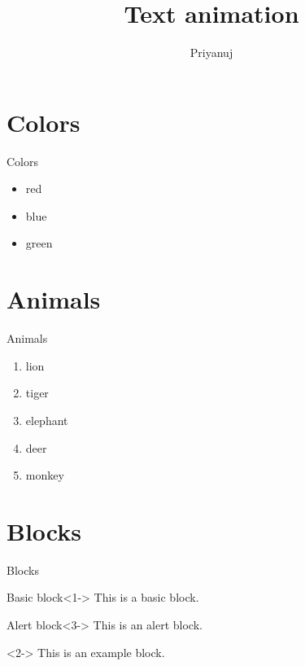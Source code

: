 \documentclass{beamer}
\title{Text animation}
\author{Priyanuj}
\date{}
\begin{document}
	\begin{frame}
		\maketitle
	\end{frame}
	
	\section{Colors}
	\begin{frame}{Colors}
		\begin{itemize}
			\item red \pause
			\item blue \pause
			\item green
		\end{itemize}
	\end{frame}
	
	\section{Animals}
	\begin{frame}{Animals}
		\begin{enumerate}
			\item<1-> lion
			\item<3> tiger
			\item<4-> elephant
			\item<2-> deer
			\item<5-> monkey
		\end{enumerate}
	\end{frame}
	
	\section{Blocks}
	\begin{frame}{Blocks}
		\begin{block}{Basic block}<1->
			This is a basic block.
		\end{block}

		\begin{alertblock}{Alert block}<3->
			This is an alert block.
		\end{alertblock}

		\begin{example}<2->
			This is an example block.
		\end{example}
	\end{frame}
	
\end{document}
